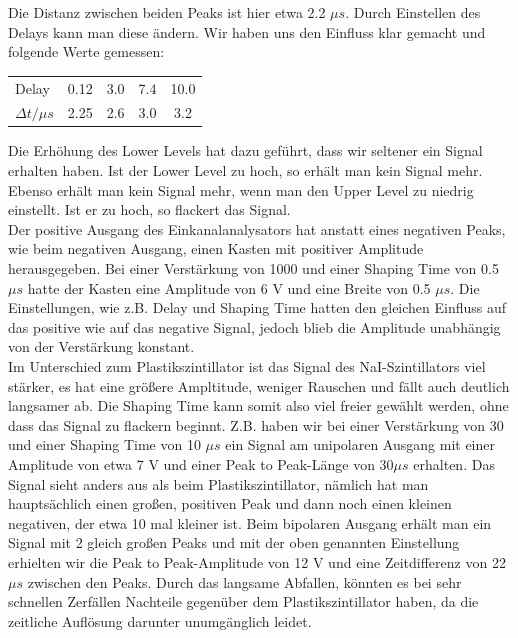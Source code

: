 Die Distanz zwischen beiden Peaks ist hier etwa 2.2 $\mu s$. Durch Einstellen des Delays kann man diese ändern. Wir haben uns den Einfluss klar gemacht und folgende Werte gemessen:\\

\begin{center}
\begin{tabular}{l c c c c}
Delay & 0.12 & 3.0 & 7.4 & 10.0\\
$\Delta t / \mu s$ & 2.25 & 2.6 & 3.0 & 3.2
\end{tabular}
\end{center}

Die Erhöhung des Lower Levels hat dazu geführt, dass wir seltener ein Signal erhalten haben. Ist der Lower Level zu hoch, so erhält man kein Signal mehr. Ebenso erhält man kein Signal mehr, wenn man den Upper Level zu niedrig einstellt. Ist er zu hoch, so flackert das Signal.\\

Der positive Ausgang des Einkanalanalysators hat anstatt eines negativen Peaks, wie beim negativen Ausgang, einen Kasten mit positiver Amplitude herausgegeben. Bei einer Verstärkung von 1000 und einer Shaping Time von 0.5 $\mu s$ hatte der Kasten eine Amplitude von 6 V und eine Breite von 0.5 $\mu s$. Die Einstellungen, wie z.B. Delay und Shaping Time hatten den gleichen Einfluss auf das positive wie auf das negative Signal, jedoch blieb die Amplitude unabhängig von der Verstärkung konstant.\\ 

Im Unterschied zum Plastikszintillator ist das Signal des NaI-Szintillators viel stärker, es hat eine größere Ampltitude, weniger Rauschen und fällt auch deutlich langsamer ab. Die Shaping Time kann somit also viel freier gewählt werden, ohne dass das Signal zu flackern beginnt. Z.B. haben wir bei einer Verstärkung von 30 und einer Shaping Time von 10 $\mu s$ ein Signal am unipolaren Ausgang mit einer Amplitude von etwa 7 V und einer Peak to Peak-Länge von 30$\mu s$ erhalten. Das Signal sieht anders aus als beim Plastikszintillator, nämlich hat man hauptsächlich einen großen, positiven Peak und dann noch einen kleinen negativen, der etwa 10 mal kleiner ist. Beim bipolaren Ausgang erhält man ein Signal mit 2 gleich großen Peaks und mit der oben genannten Einstellung erhielten wir die Peak to Peak-Amplitude von 12 V und eine Zeitdifferenz von 22 $\mu s$ zwischen den Peaks. Durch das langsame Abfallen, könnten es bei sehr schnellen Zerfällen Nachteile gegenüber dem Plastikszintillator haben, da die zeitliche Auflösung darunter unumgänglich leidet. 

